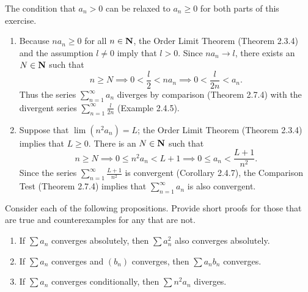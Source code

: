 \documentclass{lew98_solutions}
\begin{document}
\begin{solution}
    The condition that \( a_n > 0 \) can be relaxed to \( a_n \geq 0 \) for both parts of this exercise.
    \begin{enumerate}
        \item Because \( n a_n \geq 0 \) for all \( n \in \mathbf{N} \), the Order Limit Theorem (Theorem 2.3.4) and the assumption \( l \neq 0 \) imply that \( l > 0 \). Since \( n a_n \to l \), there exists an \( N \in \mathbf{N} \) such that
        \[
            n \geq N \implies 0 < \frac{l}{2} < n a_n \implies 0 < \frac{l}{2 n} < a_n.
        \]
        Thus the series \( \sum_{n=1}^{\infty} a_n \) diverges by comparison (Theorem 2.7.4) with the divergent series \( \sum_{n=1}^{\infty} \tfrac{l}{2n} \) (Example 2.4.5).

        \item Suppose that \( \lim (n^2 a_n) = L \); the Order Limit Theorem (Theorem 2.3.4) implies that \( L \geq 0 \). There is an \( N \in \mathbf{N} \) such that
        \[
            n \geq N \implies 0 \leq n^2 a_n < L + 1 \implies 0 \leq a_n < \frac{L + 1}{n^2}.
        \]
        Since the series \( \sum_{n=1}^{\infty} \tfrac{L + 1}{n^2} \) is convergent (Corollary 2.4.7), the Comparison Test (Theorem 2.7.4) implies that \( \sum_{n=1}^{\infty} a_n \) is also convergent.
    \end{enumerate}
\end{solution}

\begin{exercise}
\label{ex:2.7.8}
    Consider each of the following propositions. Provide short proofs for those that are true and counterexamples for any that are not.
    \begin{enumerate}
        \item If \( \sum a_n \) converges absolutely, then \( \sum a_n^2 \) also converges absolutely.

        \item If \( \sum a_n \) converges and \( (b_n) \) converges, then \( \sum a_n b_n \) converges.

        \item If \( \sum a_n \) converges conditionally, then \( \sum n^2 a_n \) diverges.
    \end{enumerate}
\end{exercise}
\end{document}
